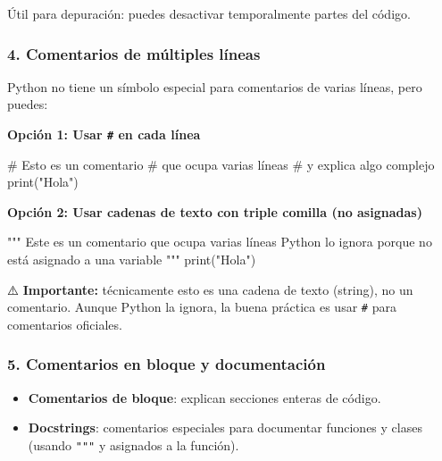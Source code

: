 \documentclass[
  doc,
  floatsintext,
  longtable,
  a4paper,
  nolmodern,
  notxfonts,
  notimes,
  12pt,
  colorlinks=true,linkcolor=blue,citecolor=blue,urlcolor=blue]{apa7}
\newenvironment{Shaded}{\begin{snugshade}}{\end{snugshade}}
\newcommand{\BuiltInTok}[1]{\textcolor[rgb]{0.00,0.23,0.31}{#1}}
\newcommand{\CommentTok}[1]{\textcolor[rgb]{0.37,0.37,0.37}{#1}}
\newcommand{\NormalTok}[1]{\textcolor[rgb]{0.00,0.23,0.31}{#1}}
\newcommand{\StringTok}[1]{\textcolor[rgb]{0.13,0.47,0.30}{#1}}
\providecommand{\tightlist}{%
  \setlength{\itemsep}{0pt}\setlength{\parskip}{0pt}}
\begin{document}
Útil para depuración: puedes desactivar temporalmente partes del código.

\subsubsection{4. Comentarios de múltiples
líneas}\label{comentarios-de-muxfaltiples-luxedneas}

Python no tiene un símbolo especial para comentarios de varias líneas,
pero puedes:

\textbf{Opción 1: Usar \texttt{\#} en cada línea}

\begin{Shaded}
\begin{Highlighting}[]
\CommentTok{\# Esto es un comentario}
\CommentTok{\# que ocupa varias líneas}
\CommentTok{\# y explica algo complejo}
\BuiltInTok{print}\NormalTok{(}\StringTok{"Hola"}\NormalTok{)}
\end{Highlighting}
\end{Shaded}

\textbf{Opción 2: Usar cadenas de texto con triple comilla (no
asignadas)}

\begin{Shaded}
\begin{Highlighting}[]
\CommentTok{"""}
\CommentTok{Este es un comentario}
\CommentTok{que ocupa varias líneas}
\CommentTok{Python lo ignora porque no está asignado a una variable}
\CommentTok{"""}
\BuiltInTok{print}\NormalTok{(}\StringTok{"Hola"}\NormalTok{)}
\end{Highlighting}
\end{Shaded}

⚠️ \textbf{Importante:} técnicamente esto es una cadena de texto
(string), no un comentario. Aunque Python la ignora, la buena práctica
es usar \texttt{\#} para comentarios oficiales.

\subsubsection{5. Comentarios en bloque y
documentación}\label{comentarios-en-bloque-y-documentaciuxf3n}

\begin{itemize}
\tightlist
\item
  \textbf{Comentarios de bloque}: explican secciones enteras de código.
\item
  \textbf{Docstrings}: comentarios especiales para documentar funciones
  y clases (usando \texttt{"""} y asignados a la función).
\end{itemize}
\end{document}
